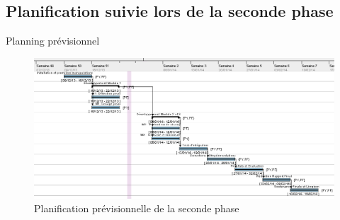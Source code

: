 \documentclass{beamer}
\begin{document}
\subsection{Planification suivie lors de la seconde phase}

\begin{frame}{Planning prévisionnel}
\begin{figure}
	\centering
		\includegraphics[width=1\textwidth]{p2_previsionnel}
	\caption{Planification prévisionnelle de la seconde phase}
	\label{fig:PlanningPrevisionnel}
\end{figure}
\end{frame}
\end{document}
